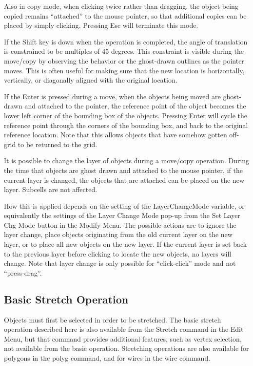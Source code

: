 Also in copy mode, when clicking twice rather than dragging, the
object being copied remains ``attached'' to the mouse pointer, so
that additional copies can be placed by simply clicking.  Pressing
{\kb Esc} will terminate this mode.

If the {\kb Shift} key is down when the operation is completed, the
angle of translation is constrained to be multiples of 45 degrees. 
This constraint is visible during the move/copy by observing the
behavior or the ghost-drawn outlines as the pointer moves.  This is
often useful for making sure that the new location is horizontally,
vertically, or diagonally aligned with the original location.

If the {\kb Enter} is pressed during a move, when the objects being
moved are ghost-drawn and attached to the pointer, the reference point
of the object becomes the lower left corner of the bounding box of the
objects.  Pressing {\kb Enter} will cycle the reference point through
the corners of the bounding box, and back to the original reference
location.  Note that this allows objects that have somehow gotten
off-grid to be returned to the grid.

It is possible to change the layer of objects during a move/copy
operation.  During the time that objects are ghost drawn and attached
to the mouse pointer, if the current layer is changed, the objects
that are attached can be placed on the new layer.  Subcells are not
affected.

How this is applied depends on the setting of the {\et
LayerChangeMode} variable, or equivalently the settings of the {\cb
Layer Change Mode} pop-up from the {\cb Set Layer Chg Mode} button
in the {\cb Modify Menu}.  The possible actions are to ignore the
layer change, place objects originating from the old current layer on
the new layer, or to place all new objects on the new layer.  If the
current layer is set back to the previous layer before clicking to
locate the new objects, no layers will change.  Note that layer change
is only possible for ``click-click'' mode and not ``press-drag''.

\subsection{Basic Stretch Operation}

Objects must first be selected in order to be stretched.  The basic
stretch operation described here is also available from the {\cb
Stretch} command in the {\cb Edit Menu}, but that command provides
additional features, such as vertex selection, not available from the
basic operation.  Stretching operations are also available for
polygons in the {\cb polyg} command, and for wires in the {\cb wire}
command.

